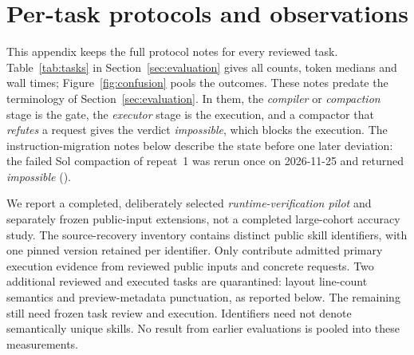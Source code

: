 \section{Per-task protocols and observations}\label{app:tasks}

This appendix keeps the full protocol notes for every reviewed task.
Table~\ref{tab:tasks} in Section~\ref{sec:evaluation} gives all counts,
token medians and wall times; Figure~\ref{fig:confusion} pools the outcomes.
These notes predate the terminology of Section~\ref{sec:evaluation}. In them,
the \emph{compiler} or \emph{compaction} stage is the gate, the
\emph{executor} stage is the execution, and a compactor that \emph{refutes}
a request gives the verdict \emph{impossible}, which blocks the execution.
The instruction-migration notes below describe the state before one later
deviation: the failed Sol compaction of repeat~1 was rerun once on
2026-11-25 and returned \emph{impossible}
().


We report a completed, deliberately selected \emph{runtime-verification
pilot} and separately frozen public-input extensions, not a completed
large-cohort accuracy study. The source-recovery inventory contains
\PilotSourceCount{} distinct public skill identifiers, with one pinned
version retained per identifier. Only \CohortReviewedTasks{} contribute
admitted primary execution evidence from reviewed public inputs and concrete
requests. Two additional reviewed and executed tasks are quarantined:
layout line-count semantics and preview-metadata punctuation, as reported below.
The remaining
\CohortTasksWithoutFrozenReview{} still need frozen task review and execution.
Identifiers need not denote semantically unique
skills. No result from earlier evaluations is pooled into these measurements.

